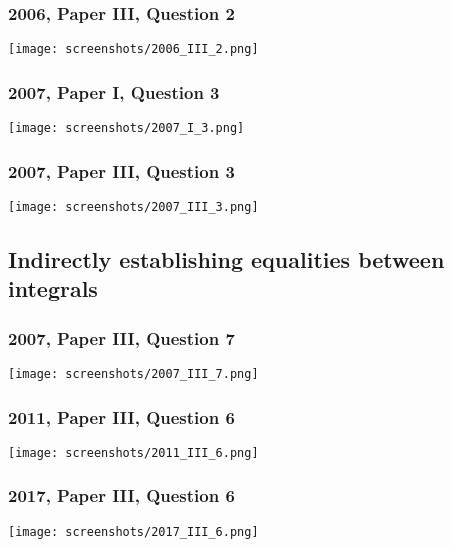 \documentclass[a4paper,12pt]{article}
\begin{document}
\subsubsection{2006, Paper III, Question 2}
\begin{center}
 \texttt{[image: screenshots/2006\_III\_2.png]}
\end{center}

\subsubsection{2007, Paper I, Question 3}
\begin{center}
 \texttt{[image: screenshots/2007\_I\_3.png]}
\end{center}

\subsubsection{2007, Paper III, Question 3}
\begin{center}
 \texttt{[image: screenshots/2007\_III\_3.png]}
\end{center}

\subsection{Indirectly establishing equalities between integrals}

\subsubsection{2007, Paper III, Question 7}
\begin{center}
 \texttt{[image: screenshots/2007\_III\_7.png]}
\end{center}

\subsubsection{2011, Paper III, Question 6}
\begin{center}
 \texttt{[image: screenshots/2011\_III\_6.png]}
\end{center}

\subsubsection{2017, Paper III, Question 6}
\begin{center}
 \texttt{[image: screenshots/2017\_III\_6.png]}
\end{center}
\end{document}
